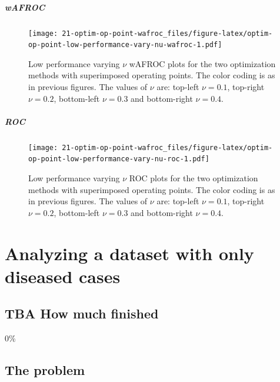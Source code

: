 \documentclass[
]{book}
\begin{document}
\hypertarget{wafroc-10}{%
\paragraph{wAFROC}\label{wafroc-10}}

\begin{figure}
\centering
\texttt{[image: 21-optim-op-point-wafroc\_files/figure-latex/optim-op-point-low-performance-vary-nu-wafroc-1.pdf]}
\caption{\label{fig:optim-op-point-low-performance-vary-nu-wafroc}Low performance varying \(\nu\) wAFROC plots for the two optimization methods with superimposed operating points. The color coding is as in previous figures. The values of \(\nu\) are: top-left \(\nu = 0.1\), top-right \(\nu = 0.2\), bottom-left \(\nu = 0.3\) and bottom-right \(\nu = 0.4\).}
\end{figure}

\hypertarget{roc-10}{%
\paragraph{ROC}\label{roc-10}}

\begin{figure}
\centering
\texttt{[image: 21-optim-op-point-wafroc\_files/figure-latex/optim-op-point-low-performance-vary-nu-roc-1.pdf]}
\caption{\label{fig:optim-op-point-low-performance-vary-nu-roc}Low performance varying \(\nu\) ROC plots for the two optimization methods with superimposed operating points. The color coding is as in previous figures. The values of \(\nu\) are: top-left \(\nu = 0.1\), top-right \(\nu = 0.2\), bottom-left \(\nu = 0.3\) and bottom-right \(\nu = 0.4\).}
\end{figure}

\hypertarget{analyze-diseased-only-dataset}{%
\chapter{Analyzing a dataset with only diseased cases}\label{analyze-diseased-only-dataset}}

\hypertarget{analyze-diseased-only-dataset-how-much-finished}{%
\section{TBA How much finished}\label{analyze-diseased-only-dataset-how-much-finished}}

0\%

\hypertarget{analyze-diseased-only-dataset-methods}{%
\section{The problem}\label{analyze-diseased-only-dataset-methods}}
\end{document}
